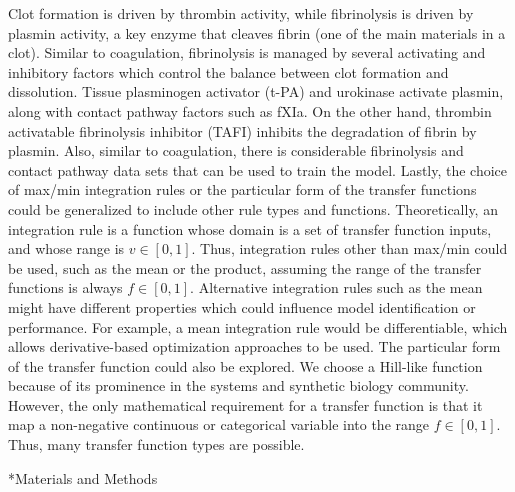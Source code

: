 \documentclass[12pt]{article}
\makeatletter
\renewcommand\section{\@startsection
	{subsection}{2}{0mm}
	{-0.2in}
	{0.05\baselineskip}
	{\normalfont\large\bfseries}}
\makeatother
\begin{document}
Clot formation is driven by thrombin activity, while fibrinolysis is driven by plasmin activity, a key enzyme that cleaves fibrin (one of the main materials in a clot).
Similar to coagulation, fibrinolysis is managed by several activating and inhibitory factors which control the balance between clot formation and dissolution.
Tissue plasminogen activator (t-PA) and urokinase activate plasmin, along with contact pathway factors such as fXIa. On the other hand, thrombin activatable fibrinolysis inhibitor (TAFI)
inhibits the degradation of fibrin by plasmin. Also, similar to coagulation, there is considerable fibrinolysis and contact pathway data sets that can be used to train the model.
Lastly, the choice of max/min integration rules or the particular form of the transfer functions could be generalized to include other rule types and functions. 
Theoretically, an integration rule is a function whose domain is a set of transfer function inputs, and whose range is $v\in[0,1]$.
Thus, integration rules other than max/min could be used, such as the mean or the product, assuming the range of the transfer functions is always $f\in[0,1]$.
Alternative integration rules such as the mean might have different properties which could influence model identification or performance. 
For example, a mean integration rule would be differentiable, which allows derivative-based optimization approaches to be used. 
The particular form of the transfer function could also be explored. We choose a Hill-like function because of its 
prominence in the systems and synthetic biology community. 
However, the only mathematical requirement for a transfer function is that it map a non-negative continuous or categorical variable into the 
range $f\in[0,1]$. Thus, many transfer function types are possible.

\clearpage

\section*{Materials and Methods}
\end{document}
